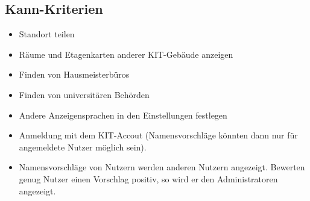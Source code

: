 \subsection{Kann-Kriterien}

\begin{itemize}

    \item Standort teilen 
    \item Räume und Etagenkarten anderer KIT-Gebäude anzeigen
    \item Finden von Hausmeisterbüros
    \item Finden von universitären Behörden
    \item Andere Anzeigensprachen in den Einstellungen festlegen
    \item Anmeldung mit dem KIT-Accout (Namensvorschläge könnten dann nur für angemeldete Nutzer möglich sein).
    \item Namensvorschläge von Nutzern werden anderen Nutzern angezeigt. Bewerten genug Nutzer einen 
    Vorschlag positiv, so wird er den Administratoren angezeigt.
    
        

\end{itemize}